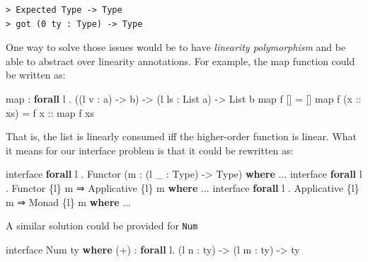 \documentclass[
]{article}
\newenvironment{Shaded}{}{}
\newcommand{\DataTypeTok}[1]{\textcolor[rgb]{0.56,0.13,0.00}{#1}}
\newcommand{\FunctionTok}[1]{\textcolor[rgb]{0.02,0.16,0.49}{#1}}
\newcommand{\KeywordTok}[1]{\textcolor[rgb]{0.00,0.44,0.13}{\textbf{#1}}}
\newcommand{\NormalTok}[1]{#1}
\newcommand{\OperatorTok}[1]{\textcolor[rgb]{0.40,0.40,0.40}{#1}}
\newcommand{\OtherTok}[1]{\textcolor[rgb]{0.00,0.44,0.13}{#1}}
\begin{document}
\begin{verbatim}
> Expected Type -> Type
> got (0 ty : Type) -> Type
\end{verbatim}

One way to solve those issues would be to have \emph{linearity
polymorphism} and be able to abstract over linearity annotations. For
example, the map function could be written as:

\begin{Shaded}
\begin{Highlighting}[]
\FunctionTok{map} \OperatorTok{:} \KeywordTok{forall}\NormalTok{ l }\OperatorTok{.}\NormalTok{ ((l v }\OperatorTok{:}\NormalTok{ a) }\OtherTok{{-}\textgreater{}}\NormalTok{ b) }\OtherTok{{-}\textgreater{}}\NormalTok{ (l ls }\OperatorTok{:} \DataTypeTok{List}\NormalTok{ a) }\OtherTok{{-}\textgreater{}} \DataTypeTok{List}\NormalTok{ b}
\FunctionTok{map}\NormalTok{ f [] }\OtherTok{=}\NormalTok{ []}
\FunctionTok{map}\NormalTok{ f (}\OtherTok{x ::}\NormalTok{ xs) }\OtherTok{=}\NormalTok{ f}\OtherTok{ x ::} \FunctionTok{map}\NormalTok{ f xs}
\end{Highlighting}
\end{Shaded}

That is, the list is linearly consumed iff the higher-order function is
linear. What it means for our interface problem is that it could be
rewritten as:

\begin{Shaded}
\begin{Highlighting}[]
\NormalTok{interface }\KeywordTok{forall}\NormalTok{ l }\OperatorTok{.} \DataTypeTok{Functor}\NormalTok{ (m }\OperatorTok{:}\NormalTok{ (l \_ }\OperatorTok{:} \DataTypeTok{Type}\NormalTok{) }\OtherTok{{-}\textgreater{}} \DataTypeTok{Type}\NormalTok{) }\KeywordTok{where}
    \OperatorTok{...}
\NormalTok{interface }\KeywordTok{forall}\NormalTok{ l }\OperatorTok{.} \DataTypeTok{Functor}\NormalTok{ \{l\} m ⇒ }\DataTypeTok{Applicative}\NormalTok{ \{l\} m }\KeywordTok{where}
    \OperatorTok{...}
\NormalTok{interface }\KeywordTok{forall}\NormalTok{ l }\OperatorTok{.} \DataTypeTok{Applicative}\NormalTok{ \{l\} m ⇒ }\DataTypeTok{Monad}\NormalTok{ \{l\} m }\KeywordTok{where}
    \OperatorTok{...}
\end{Highlighting}
\end{Shaded}

A similar solution could be provided for \texttt{Num}

\begin{Shaded}
\begin{Highlighting}[]
\NormalTok{interface }\DataTypeTok{Num}\NormalTok{ ty }\KeywordTok{where}
\NormalTok{    (}\OperatorTok{+}\NormalTok{) }\OperatorTok{:} \KeywordTok{forall}\NormalTok{ l}\OperatorTok{.}\NormalTok{ (l n }\OperatorTok{:}\NormalTok{ ty) }\OtherTok{{-}\textgreater{}}\NormalTok{ (l m }\OperatorTok{:}\NormalTok{ ty) }\OtherTok{{-}\textgreater{}}\NormalTok{ ty}
\end{Highlighting}
\end{Shaded}
\end{document}
